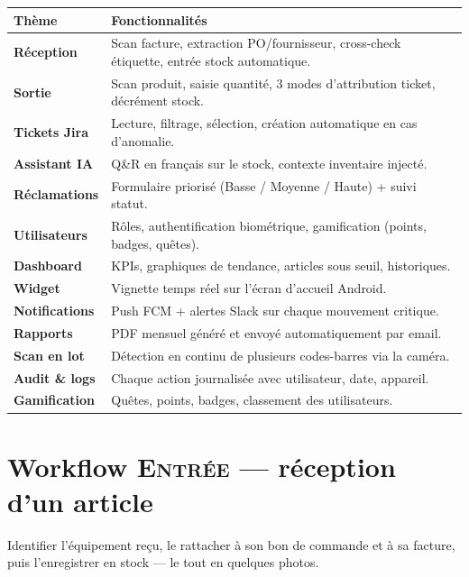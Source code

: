\documentclass[11pt,a4paper]{article}
\begin{document}
\begin{center}
\begin{tabularx}{\linewidth}{@{}lX@{}}
\toprule
\textbf{Thème} & \textbf{Fonctionnalités}\\
\midrule
\textbf{Réception}       & Scan facture, extraction PO/fournisseur, cross-check étiquette, entrée stock automatique.\\
\textbf{Sortie}          & Scan produit, saisie quantité, 3 modes d'attribution ticket, décrément stock.\\
\textbf{Tickets Jira}    & Lecture, filtrage, sélection, création automatique en cas d'anomalie.\\
\textbf{Assistant IA}    & Q\&R en français sur le stock, contexte inventaire injecté.\\
\textbf{Réclamations}    & Formulaire priorisé (Basse / Moyenne / Haute) + suivi statut.\\
\textbf{Utilisateurs}    & Rôles, authentification biométrique, gamification (points, badges, quêtes).\\
\textbf{Dashboard}       & KPIs, graphiques de tendance, articles sous seuil, historiques.\\
\textbf{Widget}          & Vignette temps réel sur l'écran d'accueil Android.\\
\textbf{Notifications}   & Push FCM + alertes Slack sur chaque mouvement critique.\\
\textbf{Rapports}        & PDF mensuel généré et envoyé automatiquement par email.\\
\textbf{Scan en lot}     & Détection en continu de plusieurs codes-barres via la caméra.\\
\textbf{Audit \& logs}   & Chaque action journalisée avec utilisateur, date, appareil.\\
\textbf{Gamification}    & Quêtes, points, badges, classement des utilisateurs.\\
\bottomrule
\end{tabularx}
\end{center}

\section{Workflow \textsc{Entrée} — réception d'un article}

\begin{infobox}[Objectif]
Identifier l'équipement reçu, le rattacher à son bon de commande et à
sa facture, puis l'enregistrer en stock — le tout en quelques photos.
\end{infobox}
\end{document}
